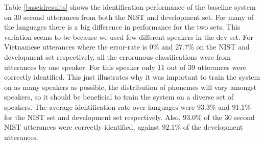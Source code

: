 Table \ref{baseidresults} shows the identification performance of the baseline system on 30 second utterances from both the NIST and development set. For many of the languages there is a big difference in performance for the two sets. This variation seems to be because we used few different speakers in the dev set. For Vietnamese utterances where the error-rate is $0$\% and $27.7$\% on the NIST and development set respectively, all the errorunous classifications were from utterances by one speaker. For this speaker only $11$ out of $39$ utterances were correctly identified. This just illustrates why it was important to train the system on as many speakers as possible, the distribution of phonemes will vary amongst speakers, so it should be beneficial to train the system on a diverse set of speakers. The average identification rate over languages were $93.3$\% and $91.1$\% for the NIST set and development set respectively. Also, $93.0$\% of the 30 second NIST utterances were correctly identified, against $92.1$\% of the development utterances. 
